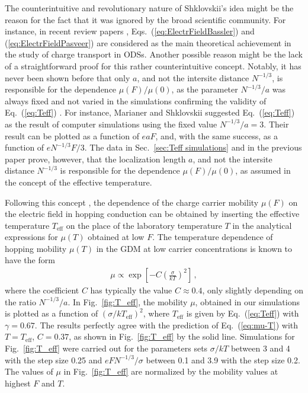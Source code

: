 \documentclass[aps,reprint,amsmath,amssymb,superscriptaddress,showpacs,prb]{revtex4-1}
\renewcommand{\alpha}{ a }
\begin{document}
The counterintuitive and revolutionary nature of Shklovskii's idea might be the reason for the fact that it was ignored by the broad scientific community. For instance, in recent review papers \cite{Kuik2014,Laquai2015}, Eqs.~(\ref{eq:ElectrFieldBassler}) and (\ref{eq:ElectrFieldPasveer}) are considered as the main theoretical achievement in the study of charge transport in ODSs.  Another possible reason might be the lack of a straightforward proof for this rather counterintuitive concept.
Notably, it has never been shown before that only $\alpha$, and not the intersite distance $N^{-1/3}$, is responsible for the dependence $\mu(F)/\mu(0)$, as the parameter $N^{-1/3}/\alpha$ was always fixed and not varied in the simulations confirming the validity of Eq.~(\ref{eq:Teff}) \cite{Marianer1992,Hess1993,Cleve1995,Jansson2008PRB}. For instance, Marianer and Shklovskii \cite{Marianer1992} suggested Eq.~(\ref{eq:Teff}) as the result of computer simulations using the fixed value $N^{-1/3}/a =3$. Their result can be plotted as a function of $eaF$, and, with the same success, as a function of $eN^{-1/3}F/3$. The data in Sec.~\ref{sec:Teff simulations} and in the previous paper \cite{Nenashev_ARKHIV2017} prove, however, that the localization length $\alpha$, and not the intersite distance $N^{-1/3}$ is responsible for the dependence $\mu(F)/\mu(0)$, as assumed in the concept of the effective temperature.



Following this concept \cite{Shklovskii1973,Shklovskii1990Fritzsche,Marianer1992,Hess1993,Cleve1995,Jansson2008PRB}, the dependence of the charge carrier mobility $\mu(F)$ on the electric field in hopping conduction can be obtained by inserting the effective temperature $T_{\text{eff}}$ on the place of the laboratory temperature $T$ in the analytical expressions for $\mu(T)$  obtained at low $F$. The temperature dependence of hopping mobility $\mu(T)$ in the GDM at low carrier concentrations is known to have the form\cite{Bassler1993}
\begin{align}
	\mu \propto \exp \left[
	- C\left(\frac{\sigma}{kT}\right)^{2}\right] \, ,
	\label{eq:mu-T}
\end{align}
where the coefficient $C$ has typically the value $C\approx 0.4$, only slightly depending on the ratio $N^{-1/3}/\alpha$.\cite{Baranovskii2000} In Fig.~\ref{fig:T_eff}, the mobility $\mu$, obtained in our simulations is  %
plotted as a function of $(\sigma/kT_{\text{eff}})^{2}$, where $T_{\text{eff}}$ is given by  Eq.~(\ref{eq:Teff}) with $\gamma = 0.67$. The results perfectly agree with the prediction of Eq.~(\ref{eq:mu-T}) with $T = T_{\text{eff}}$, $C = 0.37$, as shown in Fig.~\ref{fig:T_eff} by the solid line. Simulations for Fig.~\ref{fig:T_eff} were carried out for the parameters sets $\sigma/kT$ between 3 and 4 with the step size 0.25 and $eFN^{-1/3}/\sigma$ between 0.1 and 3.9 with the step size 0.2. The values of $\mu$ in Fig.~\ref{fig:T_eff} are normalized by the mobility values at highest $F$ and $T$.
\end{document}
